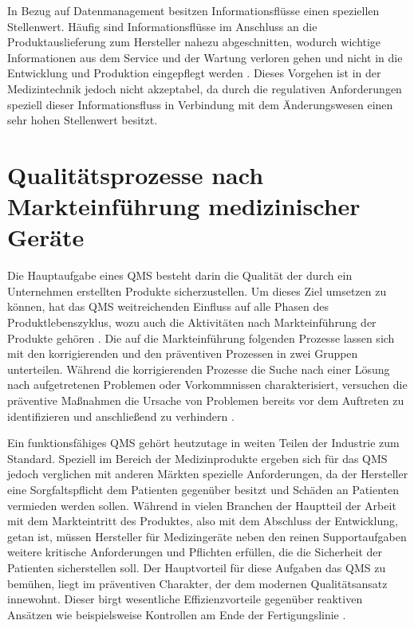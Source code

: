 \documentclass[a4paper,12pt]{report}
\begin{document}
In Bezug auf Datenmanagement besitzen Informationsflüsse einen speziellen Stellenwert. Häufig sind Informationsflüsse im Anschluss an die Produktauslieferung zum Hersteller nahezu abgeschnitten, wodurch wichtige Informationen aus dem Service und der Wartung verloren gehen und nicht in die Entwicklung und Produktion eingepflegt werden \citep[vgl.][S. 16f.]{Jun2012}. Dieses Vorgehen ist in der Medizintechnik jedoch nicht akzeptabel, da durch die regulativen Anforderungen speziell dieser Informationsfluss in Verbindung mit dem Änderungswesen einen sehr hohen Stellenwert besitzt.
\section{Qualitätsprozesse nach Markteinführung medizinischer Geräte}\label{sec:PMProzesse}
Die Hauptaufgabe eines \ac{QMS} besteht darin die Qualität der durch ein Unternehmen erstellten Produkte sicherzustellen. Um dieses Ziel umsetzen zu können, hat das \ac{QMS} weitreichenden Einfluss auf alle Phasen des Produktlebenszyklus, wozu auch die Aktivitäten nach Markteinführung der Produkte gehören \citep[vgl.][S. 13]{Cheng2003}. Die auf die Markteinführung folgenden Prozesse lassen sich mit den korrigierenden und den präventiven Prozessen in zwei Gruppen unterteilen. Während die korrigierenden Prozesse die Suche nach einer Lösung nach aufgetretenen Problemen oder Vorkommnissen charakterisiert, versuchen die präventive Maßnahmen die Ursache von Problemen bereits vor dem Auftreten zu identifizieren und anschließend zu verhindern \citep[vgl.][S. 338-350]{Abuhav2012}.

Ein funktionsfähiges \ac{QMS} gehört heutzutage in weiten Teilen der Industrie zum Standard. Speziell im Bereich der Medizinprodukte ergeben sich für das QMS jedoch verglichen mit anderen Märkten spezielle Anforderungen, da der Hersteller eine Sorgfaltspflicht dem Patienten gegenüber besitzt und Schäden an Patienten vermieden werden sollen. Während in vielen Branchen der Hauptteil der Arbeit mit dem Markteintritt des Produktes, also mit dem Abschluss der Entwicklung, getan ist, müssen Hersteller für Medizingeräte neben den reinen Supportaufgaben weitere kritische Anforderungen und Pflichten erfüllen, die die Sicherheit der Patienten sicherstellen soll. Der Hauptvorteil für diese Aufgaben das QMS zu bemühen, liegt im präventiven Charakter, der dem modernen Qualitätsansatz innewohnt. Dieser birgt wesentliche Effizienzvorteile gegenüber reaktiven Ansätzen wie beispielsweise Kontrollen am Ende der Fertigungslinie \citep[vgl.][S. 14]{Cheng2003}.
\end{document}
